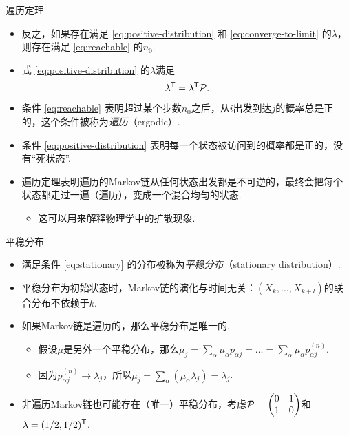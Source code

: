 {遍历定理}
\begin{theorem}[遍历定理，续]
\begin{itemize}
    \item 反之，如果存在满足 \eqref{eq:positive-distribution} 和 \eqref{eq:converge-to-limit} 的$\lambda$，则存在满足 \eqref{eq:reachable} 的$n_0$.
    \item 式 \eqref{eq:positive-distribution} 的$\lambda$满足
    \begin{equation}
        \lambda^\t = \lambda^\t\P.\label{eq:stationary}
    \end{equation}
\end{itemize}
\end{theorem}
\begin{itemize}
    \item 条件 \eqref{eq:reachable} 表明超过某个步数$n_0$之后，从$i$出发到达$j$的概率总是正的，这个条件被称为\emph{遍历}（ergodic）.
    \item 条件 \eqref{eq:positive-distribution} 表明每一个状态被访问到的概率都是正的，没有``死状态''.
    \item 遍历定理表明遍历的Markov链从任何状态出发都是不可逆的，最终会把每个状态都走过一遍（遍历），变成一个混合均匀的状态.
    \begin{itemize}
        \item 这可以用来解释物理学中的扩散现象. %
    \end{itemize}
\end{itemize}


{平稳分布}
\begin{itemize}
    \item 满足条件 \eqref{eq:stationary} 的分布被称为\emph{平稳分布}（stationary distribution）.
    \item 平稳分布为初始状态时，Markov链的演化与时间无关：$(X_k,\dots,X_{k+l})$的联合分布不依赖于$k$.
    \item 如果Markov链是遍历的，那么平稳分布是唯一的.
    \begin{itemize}
        \item 假设$\mu$是另外一个平稳分布，那么$\mu_j=\sum_\alpha\mu_\alpha p_{\alpha j}=\dots=\sum_{\alpha}\mu_\alpha p_{\alpha j}^{(n)}$.
        \item 因为$p_{\alpha j}^{(n)}\to \lambda_j$，所以$\mu_j=\sum_{\alpha} (\mu_\alpha\lambda_j)=\lambda_j$.
    \end{itemize}
    \item 非遍历Markov链也可能存在（唯一）平稳分布，考虑$\P=\begin{pmatrix}0&1\\1&0\end{pmatrix}$和$\lambda=(1/2,1/2)^\t$.
\end{itemize}


